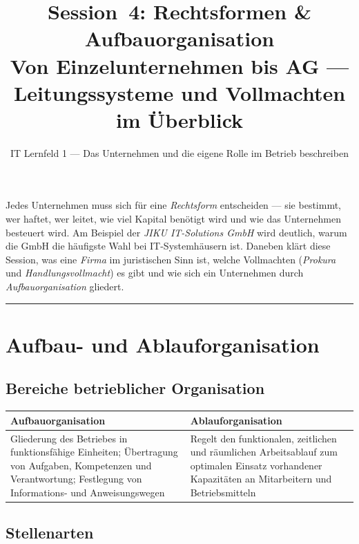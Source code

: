 \documentclass[11pt, a4paper]{article}
\title{\vspace*{-1.5cm}\Huge\bfseries\color{bfwPrimaryDark}Session~4: Rechtsformen \& Aufbauorganisation\\[0.4em]
  \large\color{bfwInkSoft}\textnormal{Von Einzelunternehmen bis AG --- Leitungssysteme und Vollmachten im Überblick}}
\author{\textsf{IT Lernfeld 1 --- Das Unternehmen und die eigene Rolle im Betrieb beschreiben}}
\date{}
\begin{document}
\maketitle
\thispagestyle{empty}

\vspace{1em}
\begin{merksatz}[title={\bfseries Worum geht es in dieser Session?}]
Jedes Unternehmen muss sich für eine \emph{Rechtsform} entscheiden --- sie bestimmt,
wer haftet, wer leitet, wie viel Kapital benötigt wird und wie das Unternehmen besteuert
wird. Am Beispiel der \emph{JIKU IT-Solutions GmbH} wird deutlich, warum die GmbH die
häufigste Wahl bei IT-Systemhäusern ist. Daneben klärt diese Session, was eine
\emph{Firma} im juristischen Sinn ist, welche Vollmachten (\emph{Prokura} und
\emph{Handlungsvollmacht}) es gibt und wie sich ein Unternehmen durch
\emph{Aufbauorganisation} gliedert.
\end{merksatz}

\tableofcontents
\vspace{1em}
\hrule
\vspace{1em}

\section{Aufbau- und Ablauforganisation}

\subsection{Bereiche betrieblicher Organisation}

\begin{center}
\begin{tabular}{p{6cm} p{7cm}}
\toprule
\textbf{Aufbauorganisation} & \textbf{Ablauforganisation}\\
\midrule
Gliederung des Betriebes in funktionsfähige Einheiten; Übertragung von Aufgaben, Kompetenzen
und Verantwortung; Festlegung von Informations- und Anweisungswegen &
Regelt den funktionalen, zeitlichen und räumlichen Arbeitsablauf zum optimalen Einsatz
vorhandener Kapazitäten an Mitarbeitern und Betriebsmitteln\\
\bottomrule
\end{tabular}
\end{center}

\subsection{Stellenarten}
\end{document}
